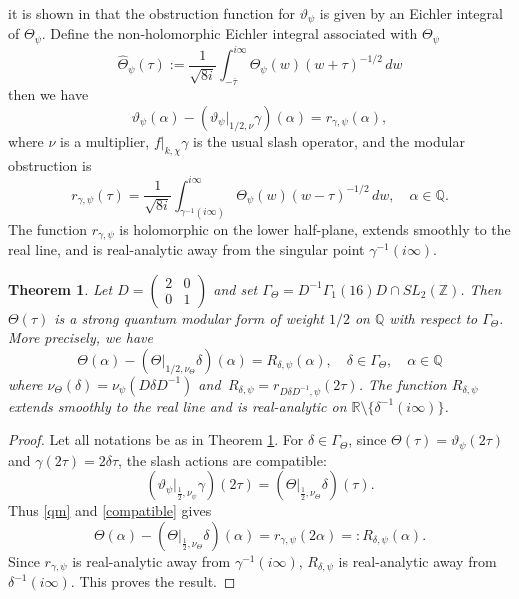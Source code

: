 \documentclass[reqno]{amsart}
\theoremstyle{definition}
\theoremstyle{plain}
\newtheorem{theorem}    {Theorem}
\theoremstyle{remark}
\numberwithin{equation}{section}
\begin{document}
it is shown in \cite{Goswami-Osburn} that the obstruction function for
\(\vartheta_{\psi}\) is given by an Eichler integral of \(\Theta_{\psi}\). Define the non-holomorphic Eichler integral associated with
\(\Theta_{\psi}\)
\[
\widehat{\Theta}_{\psi}(\tau)
:=
\frac{1}{\sqrt{8i}}
\int_{-\overline{\tau}}^{i\infty}
\Theta_{\psi}(w)(w+\tau)^{-1/2}\,dw
\]
then we have
\begin{equation}\label{qm}
\vartheta_{\psi}(\alpha)
-
\left(\vartheta_{\psi}|_{1/2,\nu}\gamma\right)(\alpha)
=
r_{\gamma,\psi}(\alpha),
\end{equation}
where $\nu$ is a multiplier, $f|_{k,\chi}\gamma$ is the usual slash operator, and 
the modular obstruction is
\begin{equation}\label{eq:quantum-cocycle}
r_{\gamma,\psi}(\tau)
=
\frac{1}{\sqrt{8i}}
\int_{\gamma^{-1}(i\infty)}^{i\infty}
\Theta_{\psi}(w)(w-\tau)^{-1/2}\,dw,\quad \alpha\in\mathbb{Q}.
\end{equation}
The function \(r_{\gamma,\psi}\) is holomorphic on the lower half-plane,
extends smoothly to the real line, and is real-analytic away from the singular
point \(\gamma^{-1}(i\infty)\). 
\begin{theorem}\label{thm:quantum-modularity}
Let $D=\begin{pmatrix}2&0\\0&1\end{pmatrix}$ and set $\Gamma_\Theta=
D^{-1}\Gamma_1(16)D\cap SL_2(\mathbb Z)$. Then \(\Theta(\tau)\) is a strong
quantum modular form of weight \(1/2\) on \(\mathbb Q\) with respect to
\(\Gamma_\Theta\). More precisely, we have 
\begin{equation*}
\Theta(\alpha)-(\Theta|_{1/2,\nu_\Theta}\delta)(\alpha)=R_{\delta,\psi}(\alpha),\quad \delta\in\Gamma_\Theta,\quad\alpha\in\mathbb{Q}    
\end{equation*}
where $\nu_\Theta(\delta)=\nu_\psi(D\delta D^{-1})$ and $\,R_{\delta,\psi}=r_{D\delta D^{-1},\psi}(2\tau)$. The function \(R_{\delta,\psi}\) extends smoothly to the real line and is
real-analytic on $\mathbb R\setminus\{\delta^{-1}(i\infty)\}$.
\end{theorem}
\begin{proof}
Let all notations be as in Theorem \ref{thm:quantum-modularity}. For \(\delta\in\Gamma_{\Theta}\), since \(\Theta(\tau)=\vartheta_{\psi}(2\tau)\) and $\gamma(2\tau)=2\delta\tau$, the slash actions are compatible:
\begin{equation}\label{compatible}
\left(\vartheta_{\psi}\big|_{\frac12,\nu_{\psi}}\gamma\right)(2\tau)
=
\left(\Theta\big|_{\frac12,\nu_{\Theta}}\delta\right)(\tau).    
\end{equation}
Thus \eqref{qm} and \eqref{compatible} gives
\[
\Theta(\alpha)
-
\left(\Theta\big|_{\frac12,\nu_{\Theta}}\delta\right)(\alpha)
=
r_{\gamma,\psi}(2\alpha)=:R_{\delta,\psi}(\alpha).
\]
Since \(r_{\gamma,\psi}\) is real-analytic away from \(\gamma^{-1}(i\infty)\),
\(R_{\delta,\psi}\) is real-analytic away from \(\delta^{-1}(i\infty)\).  This
proves the result.
\end{proof}
\end{document}
